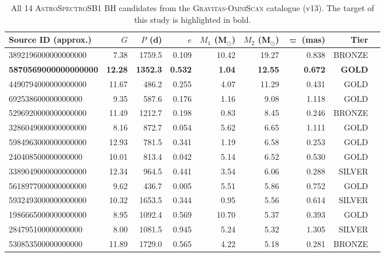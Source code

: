 \begin{table}
\centering
\caption{All 14 \textsc{AstroSpectroSB1} BH candidates from the \textsc{Gravitas-OmniScan} catalogue (v13). The target of this study is highlighted in bold.}
\label{tab:astrospectrosb1_population}
\begin{tabular}{lrrrrrrrl}
\hline
Source ID (approx.) & $G$ & $P$ (d) & $e$ & $M_1$ (\hbox{M$_\odot$}) & $M_2$ (\hbox{M$_\odot$}) & $\varpi$ (mas) & Tier \\
\hline
3892196000000000000 & 7.38 & 1759.5 & 0.109 & 10.42 & 19.27 & 0.838 & BRONZE \\
\textbf{5870569000000000000} & \textbf{12.28} & \textbf{1352.3} & \textbf{0.532} & \textbf{1.04} & \textbf{12.55} & \textbf{0.672} & \textbf{GOLD} \\
4490794000000000000 & 11.67 & 486.2 & 0.255 & 4.07 & 11.29 & 0.431 & GOLD \\
692538600000000000 & 9.35 & 587.6 & 0.176 & 1.16 & 9.08 & 1.118 & GOLD \\
5296920000000000000 & 11.49 & 1212.7 & 0.198 & 0.83 & 8.45 & 0.246 & BRONZE \\
3286049000000000000 & 8.16 & 872.7 & 0.054 & 5.62 & 6.65 & 1.111 & GOLD \\
5984963000000000000 & 12.93 & 781.5 & 0.341 & 1.19 & 6.58 & 0.253 & GOLD \\
240408500000000000 & 10.01 & 813.4 & 0.042 & 5.14 & 6.52 & 0.530 & GOLD \\
3389049000000000000 & 12.34 & 964.5 & 0.441 & 3.54 & 6.06 & 0.288 & SILVER \\
5618977000000000000 & 9.62 & 436.7 & 0.005 & 5.51 & 5.86 & 0.752 & GOLD \\
5932493000000000000 & 10.32 & 1653.5 & 0.344 & 0.95 & 5.56 & 0.614 & SILVER \\
1986665000000000000 & 8.95 & 1092.4 & 0.569 & 10.70 & 5.37 & 0.393 & GOLD \\
284795100000000000 & 8.00 & 1081.5 & 0.945 & 5.24 & 5.32 & 1.305 & SILVER \\
530853500000000000 & 11.89 & 1729.0 & 0.565 & 4.22 & 5.18 & 0.281 & BRONZE \\
\hline
\end{tabular}
\end{table}